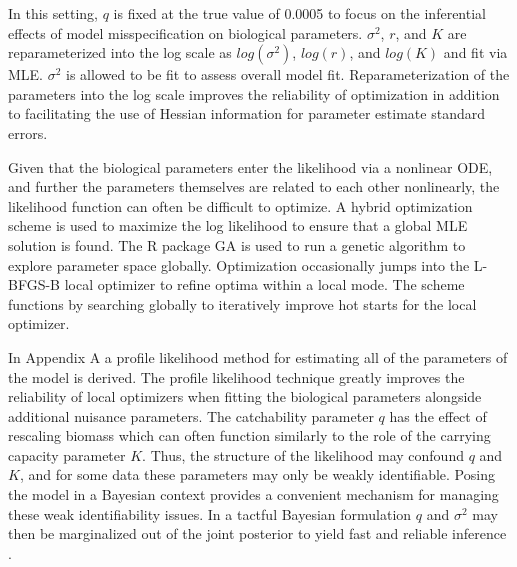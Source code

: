 \documentclass[12pt]{article}
\begin{document}
{%
In this setting, $q$ is fixed at the true value of 0.0005 to focus on the 
inferential effects of model misspecification on biological parameters. 
$\sigma^2$, $r$, and $K$ are reparameterized into the log scale as 
$log(\sigma^2)$, $log(r)$, and $log(K)$ and fit via MLE. $\sigma^2$ is
allowed to be fit to assess overall model fit. Reparameterization 
of the parameters into the log scale improves the reliability of optimization
in addition to facilitating the use of Hessian information for parameter 
estimate standard errors.

%
Given that the biological parameters enter the likelihood via a nonlinear ODE, 
and further the parameters themselves are related to each other nonlinearly, 
the likelihood function can often be difficult to optimize. A hybrid optimization 
scheme is used to maximize the log likelihood to ensure that a global MLE solution 
is found. The R package GA  is 
used to run a genetic algorithm to explore parameter space globally. 
Optimization occasionally jumps into the L-BFGS-B local optimizer to refine 
optima within a local mode. The scheme functions by searching globally to 
iteratively improve hot starts for the local optimizer. 

In Appendix A a profile likelihood method for estimating all of the 
parameters of the model is derived. The profile likelihood technique greatly 
improves the reliability of local optimizers when fitting the biological parameters 
alongside additional nuisance parameters. The catchability parameter $q$ has the 
effect of rescaling biomass which can often function similarly to the role of the 
carrying capacity parameter $K$. Thus, the structure of the likelihood may 
confound $q$ and $K$, and for some data these parameters may only be weakly 
identifiable. Posing the model in a Bayesian context provides a convenient 
mechanism for managing these weak identifiability issues. In a tactful Bayesian 
formulation $q$ and $\sigma^2$ may then be marginalized out of the joint posterior 
to yield fast and reliable inference . %


%  

}
\end{document}

